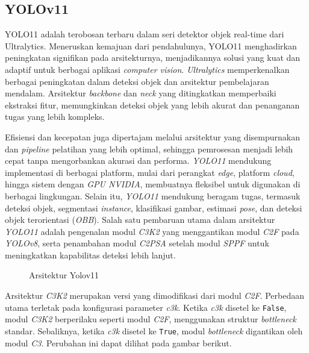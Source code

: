 \subsection{YOLOv11}
\label{subsec:YOLOv11}

YOLO11 adalah terobosan terbaru dalam seri detektor objek real-time dari Ultralytics. Meneruskan kemajuan dari pendahulunya, YOLO11 menghadirkan peningkatan signifikan pada arsitekturnya, menjadikannya solusi yang kuat dan adaptif untuk berbagai aplikasi \emph{computer vision}. \emph{Ultralytics} memperkenalkan berbagai peningkatan dalam deteksi objek dan arsitektur pembelajaran mendalam. Arsitektur \emph{backbone} dan \emph{neck} yang ditingkatkan memperbaiki ekstraksi fitur, memungkinkan deteksi objek yang lebih akurat dan penanganan tugas yang lebih kompleks. 

Efisiensi dan kecepatan juga dipertajam melalui arsitektur yang disempurnakan dan \emph{pipeline} pelatihan yang lebih optimal, sehingga pemrosesan menjadi lebih cepat tanpa mengorbankan akurasi dan performa. \emph{YOLO11} mendukung implementasi di berbagai platform, mulai dari perangkat \emph{edge}, platform \emph{cloud}, hingga sistem dengan \emph{GPU NVIDIA}, membuatnya fleksibel untuk digunakan di berbagai lingkungan. Selain itu, \emph{YOLO11} mendukung beragam tugas, termasuk deteksi objek, segmentasi \emph{instance}, klasifikasi gambar, estimasi \emph{pose}, dan deteksi objek terorientasi (\emph{OBB}). Salah satu pembaruan utama dalam arsitektur \emph{YOLO11} adalah pengenalan modul \emph{C3K2} yang menggantikan modul \emph{C2F} pada \emph{YOLOv8}, serta penambahan modul \emph{C2PSA} setelah modul \emph{SPPF} untuk meningkatkan kapabilitas deteksi lebih lanjut.

\begin{figure}[H]
  
  \caption{Arsitektur Yolov11}
  \label{fig:ArsitekturYolov11}
\end{figure}

Arsitektur \emph{C3K2} merupakan versi yang dimodifikasi dari modul \emph{C2F}. Perbedaan utama terletak pada konfigurasi parameter \emph{c3k}. Ketika \emph{c3k} disetel ke \texttt{False}, modul \emph{C3K2} berperilaku seperti modul \emph{C2F}, menggunakan struktur \emph{bottleneck} standar. Sebaliknya, ketika \emph{c3k} disetel ke \texttt{True}, modul \emph{bottleneck} digantikan oleh modul \emph{C3}. Perubahan ini dapat dilihat pada gambar berikut.

